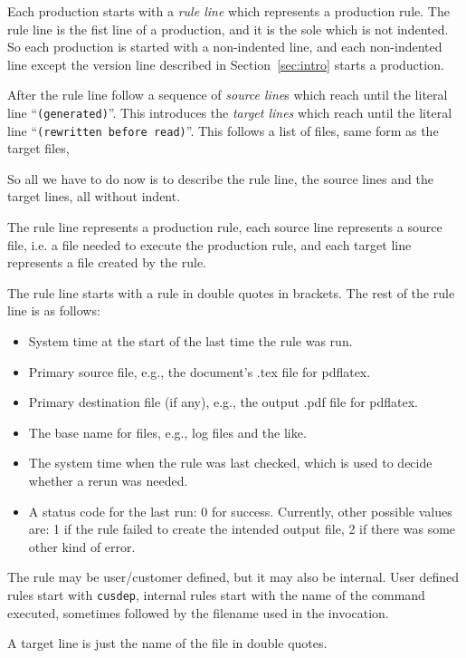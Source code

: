 \documentclass[a4paper]{article}%
\begin{document}
Each production starts with a \emph{rule line} which represents a production rule. 
The rule line is the fist line of a production, and it is the sole which is not indented.  
So each production is started with a non-indented line, 
and each non-indented line except the version line described in Section~\ref{sec:intro} starts a production. 

After the rule line follow a sequence of \emph{source line}s 
which reach until the literal line ``\texttt{(generated)}''. 
This introduces the \emph{target lines} 
which reach until the literal line ``\texttt{(rewritten before read)}''. 
This follows a list of files, same form as the target files, 

So all we have to do now is to describe the rule line, 
the source lines and the target lines, all without indent. 

The rule line represents a production rule, 
each source line represents a source file, 
i.e. a file needed to execute the production rule, 
and each target line represents a file created by the rule. 

The rule line starts with a rule in double quotes in brackets. 
The rest of the rule line is as follows: 
%
\begin{itemize}
  \item 
  System time at the start of the last time the rule was run.
  \item 
  Primary source file, e.g., the document's .tex file for pdflatex.
  \item 
  Primary destination file (if any), e.g., the output .pdf file for pdflatex.
  \item 
  The base name for files, e.g., log files and the like.
  \item 
  The system time when the rule was last checked, 
  which is used to decide whether a rerun was needed.
  \item
  A status code for the last run: 0 for success. Currently, other possible values are: 1 if the rule failed to create the intended output file, 2 if there was some other kind of error.

\end{itemize}

The rule may be user/customer defined, but it may also be internal. 
User defined rules start with \texttt{cusdep}, 
internal rules start with the name of the command executed, 
sometimes followed by the filename used in the invocation. 

A target line is just the name of the file in double quotes. 
\end{document}
